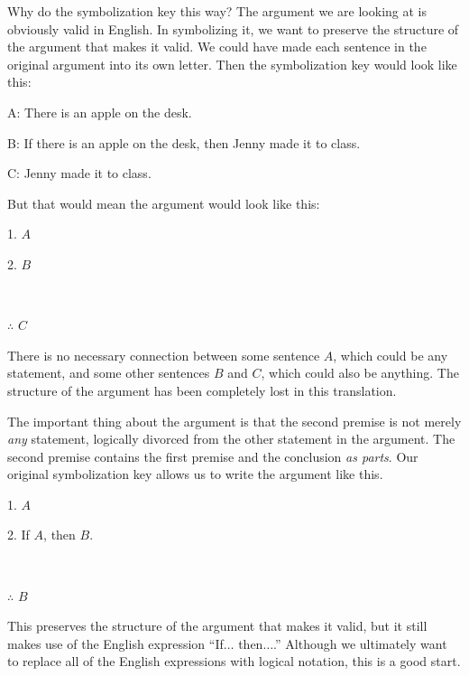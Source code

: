 Why do the symbolization key this way? The argument we are looking at is obviously valid in English. In symbolizing it, we want to preserve the structure of the argument that makes it valid. We could have made each sentence in the original argument into its own letter. Then the symbolization key would look like this: 

\begin{ekey}
\item[A:]There is an apple on the desk.
\item[B:]If there is an apple on the desk, then Jenny made it to class.
\item[C:]Jenny made it to class.
\end{ekey}
But that would mean the argument would look like this:
\begin{earg}
\item[1.] $A$
\item[2.] $B$
\item[] \textcolor{white}{.}\sout{\hspace{.05\linewidth}}\textcolor{white}{.} 
\item[$\therefore$] $C$
\end{earg}
There is no necessary connection between some sentence $A$, which could be any statement, and some other sentences $B$ and $C$, which could also be anything. The structure of the argument has been completely lost in this translation.

The important thing about the argument is that the second premise is not merely \emph{any} statement, logically divorced from the other statement in the argument. The second premise contains the first premise and the conclusion \emph{as parts}. Our original symbolization key allows us to write the argument like this.

\begin{earg}
\item[1.] $A$
\item[2.] If $A$, then $B$.
\item[] \textcolor{white}{.}\sout{\hspace{.2\linewidth}}\textcolor{white}{.} 
\item[$\therefore$] $B$
\end{earg}
This preserves the structure of the argument that makes it valid, but it still makes use of the English expression ``If$\ldots$ then$\ldots$.'' Although we ultimately want to replace all of the English expressions with logical notation, this is a good start.

